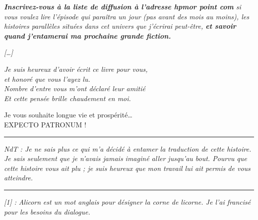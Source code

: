 \begin{center}\emph{\textbf{Inscrivez-vous à la liste de diffusion à l'adresse hpmor point com}  si vous voulez lire l'épisode qui paraîtra un jour (pas avant des mois au moins), les histoires parallèles situées dans cet univers que j'écrirai peut-être, \textbf{et savoir quand j'entamerai ma prochaine grande fiction.} } \end{center}



\begin{center}\emph{[…]} \end{center}



\begin{center}\emph{Je suis heureux d'avoir écrit ce livre pour vous,} \\\emph{et honoré que vous l'ayez lu.} \\\emph{Nombre d'entre vous m'ont déclaré leur amitié} \\\emph{Et cette pensée brille chaudement en moi.} \end{center}


Je vous souhaite longue vie et prospérité…\\EXPECTO PATRONUM !
\par\noindent\rule{\textwidth}{0.4pt}
\emph{NdT : Je ne sais plus ce qui m'a décidé à entamer la traduction de cette histoire. Je sais seulement que je n'avais jamais imaginé aller jusqu'au bout. Pourvu que cette histoire vous ait plu ; je suis heureux que mon travail lui ait permis de vous atteindre.} 
\par\noindent\rule{\textwidth}{0.4pt}
\emph{[1] : } \emph{} \emph{Alicorn} \emph{ est un mot anglais pour désigner la corne de licorne. Je l'ai francisé pour les besoins du dialogue.} 

